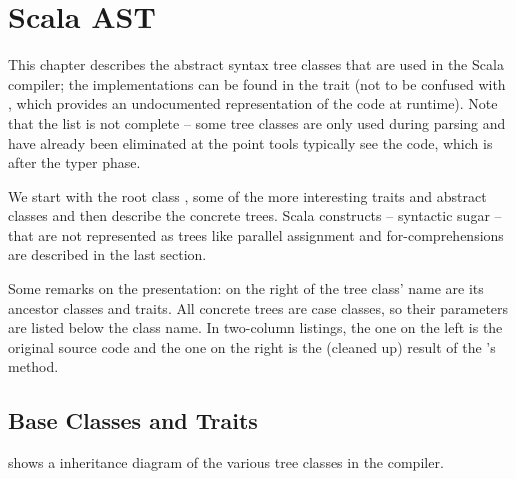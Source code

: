 \chapter{Scala AST} \label{chapter:scala-ast}

This chapter describes the abstract syntax tree classes that are used in the Scala compiler; the implementations can be found in the  trait (not to be confused with , which provides an undocumented representation of the code at runtime). Note that the list is not complete -- some tree classes are only used during parsing and have already been eliminated at the point tools typically see the code, which is after the typer phase.

We start with the root class , some of the more interesting traits and abstract classes and then describe the concrete trees. Scala constructs -- syntactic sugar -- that are not represented as trees like parallel assignment and for-comprehensions are described in the last section.

Some remarks on the presentation: on the right of the tree class' name are its ancestor classes and traits. All concrete trees are case classes, so their parameters are listed below the class name. In two-column listings, the one on the left is the original source code and the one on the right is the (cleaned up) result of the 's  method.

\newcommand{\member} [2] {\hfill \begin{footnotesize}\src{#1} \newline \vspace{5pt} \src{#2}\end{footnotesize}\vspace{5pt}}

\section{Base Classes and Traits}

 shows a inheritance diagram of the various tree classes in the compiler.

